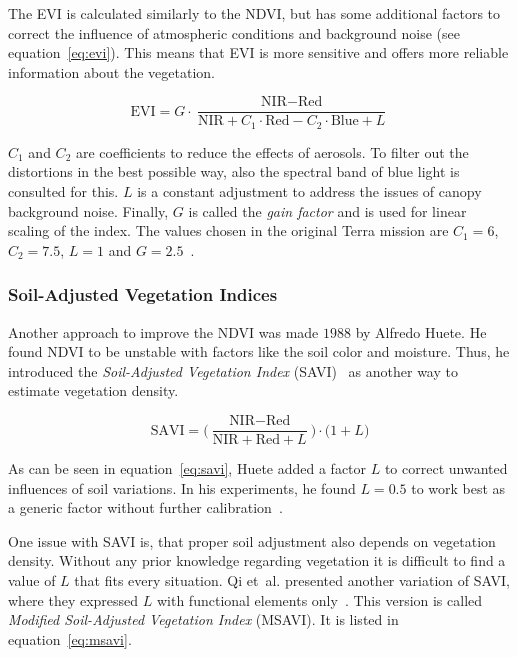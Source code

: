 The EVI is calculated similarly to the NDVI, but has some additional factors to correct the influence of atmospheric conditions and background noise (see equation~\ref{eq:evi}). This means that EVI is more sensitive and offers more reliable information about the vegetation.

\begin{equation}
    \text{EVI} = G \cdot \frac{
    \text{NIR}-\text{Red}
    }{
    \text{NIR} + C_1 \cdot \text{Red} - C_2 \cdot \text{Blue} + L
    }
    \label{eq:evi}
\end{equation}

$C_1$ and $C_2$ are coefficients to reduce the effects of aerosols. To filter out the distortions in the best possible way, also the spectral band of blue light is consulted for this. $L$ is a constant adjustment to address the issues of canopy background noise. Finally, $G$ is called the \emph{gain factor} and is used for linear scaling of the index. The values chosen in the original Terra mission are $C_1=6$, $C_2=7.5$, $L=1$ and $G=2.5$~\cite{modis2002}.

\subsubsection{Soil-Adjusted Vegetation Indices}
Another approach to improve the NDVI was made $1988$ by Alfredo Huete. He found NDVI to be unstable with factors like the soil color and moisture. Thus, he introduced the \emph{Soil-Adjusted Vegetation Index} (SAVI)~\cite{savi88} as another way to estimate vegetation density.

\begin{equation}
    \displaystyle
    \text{SAVI} =
    \bigg(
    \frac{\text{NIR} - \text{Red}}
    {\text{NIR} + \text{Red} + L}
    \bigg) \cdot \big(1 + L \big)
    \label{eq:savi}
\end{equation}

As can be seen in equation~\ref{eq:savi}, Huete added a factor $L$ to correct unwanted influences of soil variations. In his experiments, he found $L=0.5$ to work best as a generic factor without further calibration~\cite{savi88}.

One issue with SAVI is, that proper soil adjustment also depends on vegetation density. Without any prior knowledge regarding vegetation it is difficult to find a value of $L$ that fits every situation. Qi et~al. presented another variation of SAVI, where they expressed $L$ with functional elements only~\cite{msavi94}. This version is called \emph{Modified Soil-Adjusted Vegetation Index} (MSAVI). It is listed in equation~\ref{eq:msavi}.

